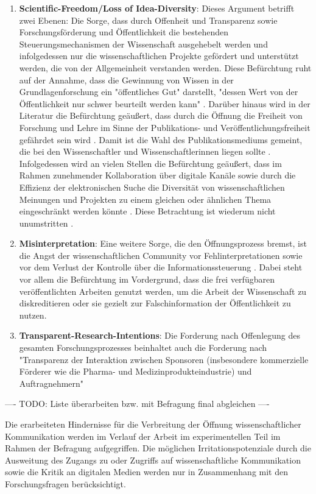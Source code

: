\begin{enumerate}
\item \textbf{Scientific-Freedom/Loss of Idea-Diversity}: Dieses Argument betrifft zwei Ebenen: Die Sorge, dass durch Offenheit und Transparenz sowie Forschungsförderung und Öffentlichkeit die bestehenden Steuerungsmechanismen der Wissenschaft ausgehebelt werden und infolgedessen nur die wissenschaftlichen Projekte gefördert und unterstützt werden, die von der Allgemeinheit verstanden werden. Diese Befürchtung ruht auf der Annahme, dass die Gewinnung von Wissen in der Grundlagenforschung ein "öffentliches Gut" darstellt, "dessen Wert von der Öffentlichkeit nur schwer beurteilt werden kann" \cite{Osterloh_2008}. Darüber hinaus wird in der Literatur die Befürchtung geäußert, dass durch die Öffnung die Freiheit von Forschung und Lehre im Sinne der Publikations- und Veröffentlichungsfreiheit gefährdet sein wird \cite{Jochum_2009}. Damit ist die Wahl des Publikationsmediums gemeint, die bei den Wissenschaftler und Wissenschaftlerinnen liegen sollte \cite{BBAW_2015}. Infolgedessen wird an vielen Stellen die Befürchtung geäußert, dass im Rahmen zunehmender Kollaboration über digitale Kanäle sowie durch die Effizienz der elektronischen Suche die Diversität von wissenschaftlichen Meinungen und Projekten zu einem gleichen oder ähnlichen Thema eingeschränkt werden könnte \cite{Evans_2008}. Diese Betrachtung ist wiederum nicht unumstritten \cite{Lariviere_2009}.
\item \textbf{Misinterpretation}: Eine weitere Sorge, die den Öffnungsprozess bremst, ist die Angst der wissenschaftlichen Community vor Fehlinterpretationen \cite{Grand_2012} sowie vor dem Verlust der Kontrolle über die Informationssteuerung \cite{Gibbons_1994}. Dabei steht vor allem die Befürchtung im Vordergrund, dass die frei verfügbaren veröffentlichten Arbeiten genutzt werden, um die Arbeit der Wissenschaft zu diskreditieren oder sie gezielt zur Falschinformation der Öffentlichkeit zu nutzen.
\item \textbf{Transparent-Research-Intentions}: Die Forderung nach Offenlegung des gesamten Forschungsprozesses beinhaltet auch die Forderung nach "Transparenz der Interaktion zwischen Sponsoren (insbesondere kommerzielle Förderer wie die Pharma- und Medizinprodukteindustrie) und Auftragnehmern" \cite{Stengel_2013}
\end{enumerate}

---- TODO: Liste überarbeiten  bzw. mit Befragung final abgleichen ----

Die erarbeiteten Hindernisse für die Verbreitung der Öffnung wissenschaftlicher Kommunikation werden im Verlauf der Arbeit im experimentellen Teil im Rahmen der Befragung aufgegriffen. Die möglichen Irritationspotenziale durch die Ausweitung des Zugangs zu oder Zugriffs auf wissenschaftliche Kommunikation sowie die Kritik an digitalen Medien werden nur in Zusammenhang mit den Forschungsfragen berücksichtigt.

